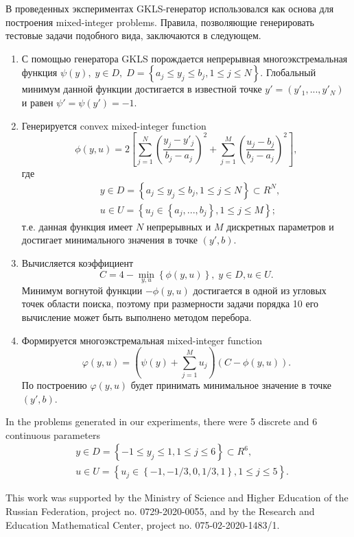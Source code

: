 \documentclass[
11pt,%
tightenlines,%
twoside,%
onecolumn,%
nofloats,%
nobibnotes,%
nofootinbib,%
superscriptaddress,%
noshowpacs,%
centertags]%
{revtex4}
\begin{document}
В проведенных экспериментах GKLS-генератор использовался как основа для построения mixed-integer problems. Правила, позволяющие генерировать тестовые задачи подобного вида, заключаются в следующем.

\begin{enumerate}
	\item С помощью генератора GKLS порождается непрерывная многоэкстремальная функция $\psi(y), \; y\in D, \; D = \left\{ a_j\leq y_j\leq b_j, 1\leq j \leq N \right\}$. Глобальный минимум данной функции достигается в известной точке $y'=(y'_1,...,y'_N)$ и равен $\psi'=\psi(y')=-1$.
	\item Генерируется convex mixed-integer function 
	\[
			\phi (y,u) = 2 \left[ \sum_{j=1}^N \left( \frac{y_j - y'_j}{b_j-a_j} \right)^2 + \sum_{j=1}^M \left( \frac{u_j - b_j}{b_j-a_j} \right)^2 \right],
	\]
	где 
	\begin{eqnarray*}
	& y\in D = \left\{ a_j\leq y_j\leq b_j, 1\leq j \leq N \right\} \subset R^N, \\
	& u\in U = \left\{ u_j \in  \left\{a_j, ..., b_j \right\}, 1\leq j \leq M \right\};
	\end{eqnarray*}
	т.е. данная функция имеет $N$ непрерывных и $M$ дискретных параметров и достигает минимального значения в точке $(y',b)$.
	\item Вычисляется коэффициент 
	\[
	C = 4 - \min_{y,u} \left\{ \phi(y,u) \right\}, \; y\in D, u \in U.
	\]
	Минимум вогнутой функции $-\phi(y,u)$ достигается в одной из угловых точек области поиска, поэтому при размерности задачи порядка 10 его вычисление может быть выполнено методом перебора.
	\item Формируется многоэкстремальная mixed-integer function 
	\[
	\varphi(y,u) = \left(\psi(y) + \sum_{j=1}^M{u_j}\right)\left(C - \phi(y,u)\right).
	\]
	По построению $\varphi(y,u)$  будет принимать минимальное значение в точке $(y',b)$.
	
\end{enumerate}


In the problems generated in our experiments, there were 5 discrete and 6 continuous parameters 
	\begin{eqnarray*}
	& y\in D = \left\{ -1 \leq y_j\leq 1, 1\leq j \leq 6 \right\} \subset R^6, \\
	& u\in U = \left\{ u_j \in  \left\{-1, -1/3, 0, 1/3, 1 \right\}, 1\leq j \leq 5 \right\}.
	\end{eqnarray*}




\begin{acknowledgments}
This work was supported by the Ministry of Science and Higher Education of the Russian Federation, project no. 0729-2020-0055, and by the Research and Education Mathematical Center, project no. 075-02-2020-1483/1.
\end{acknowledgments}
\end{document}
